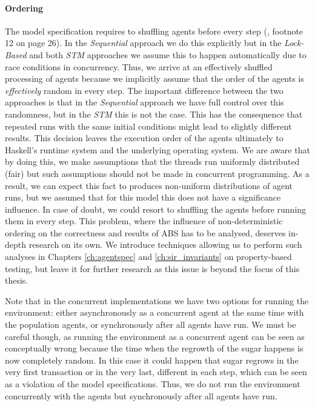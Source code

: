 \paragraph{Ordering} The model specification requires to shuffling agents before every step (\cite{epstein_growing_1996}, footnote 12 on page 26). In the \textit{Sequential} approach we do this explicitly but in the \textit{Lock-Based} and both \textit{STM} approaches we assume this to happen automatically due to race conditions in concurrency. Thus, we arrive at an effectively shuffled processing of agents because we implicitly assume that the order of the agents is \textit{effectively} random in every step. The important difference between the two approaches is that in the \textit{Sequential} approach we have full control over this randomness, but in the \textit{STM} this is not the case. This has the consequence that repeated runs with the same initial conditions might lead to slightly different results. 
This decision leaves the execution order of the agents ultimately to Haskell's runtime system and the underlying operating system. We are aware that by doing this, we make assumptions that the threads run uniformly distributed (fair) but such assumptions should not be made in concurrent programming. As a result, we can expect this fact to produces non-uniform distributions of agent runs, but we assumed that for this model this does not have a significance influence. In case of doubt, we could resort to shuffling the agents before running them in every step. This problem, where the influence of non-deterministic ordering on the correctness and results of ABS has to be analysed, deserves in-depth research on its own. We introduce techniques allowing us to perform such analyses in Chapters \ref{ch:agentspec} and \ref{ch:sir_invariants} on property-based testing, but leave it for further research as this issue is beyond the focus of this thesis.

Note that in the concurrent implementations we have two options for running the environment: either asynchronously as a concurrent agent at the same time with the population agents, or synchronously after all agents have run. We must be careful though, as running the environment as a concurrent agent can be seen as conceptually wrong because the time when the regrowth of the sugar happens is now completely random. In this case it could happen that sugar regrows in the very first transaction or in the very last, different in each step, which can be seen as a violation of the model specifications. Thus, we do not run the environment concurrently with the agents but synchronously after all agents have run.

